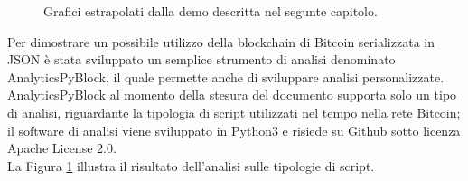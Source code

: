 \begin{figure}
	\centering
	\caption{Grafici estrapolati dalla demo descritta nel segunte capitolo.}
	\label{fig:analisisScript}
\end{figure}

Per dimostrare un possibile utilizzo della blockchain di Bitcoin serializzata in JSON è stata sviluppato un semplice strumento di analisi denominato AnalyticsPyBlock, il quale permette anche di sviluppare analisi personalizzate.\\
AnalyticsPyBlock al momento della stesura del documento supporta solo un tipo di analisi, riguardante la tipologia di script utilizzati nel tempo nella rete Bitcoin; il software di analisi viene sviluppato in Python3 e risiede su Github sotto licenza Apache License 2.0.\\
La Figura \ref{fig:analisisScript} illustra il risultato dell'analisi sulle tipologie di script.


